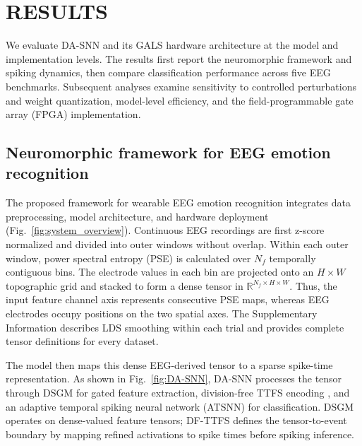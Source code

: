 ﻿\documentclass{nsr}
\begin{document}
\section{RESULTS}
We evaluate DA-SNN and its GALS hardware architecture at the model and implementation levels. The results first report the neuromorphic framework and spiking dynamics, then compare classification performance across five EEG benchmarks. Subsequent analyses examine sensitivity to controlled perturbations and weight quantization, model-level efficiency, and the field-programmable gate array (FPGA) implementation.


\subsection{Neuromorphic framework for EEG emotion recognition}

The proposed framework for wearable EEG emotion recognition integrates data preprocessing, model architecture, and hardware deployment (Fig.~\ref{fig:system_overview}). Continuous EEG recordings are first z-score normalized and divided into outer windows without overlap. Within each outer window, power spectral entropy (PSE) is calculated over $N_f$ temporally contiguous bins. The electrode values in each bin are projected onto an $H\times W$ topographic grid and stacked to form a dense tensor in $\mathbb{R}^{N_f\times H\times W}$. Thus, the input feature channel axis represents consecutive PSE maps, whereas EEG electrodes occupy positions on the two spatial axes. The Supplementary Information describes LDS smoothing within each trial and provides complete tensor definitions for every dataset.

The model then maps this dense EEG-derived tensor to a sparse spike-time representation. As shown in Fig.~\ref{fig:DA-SNN}, DA-SNN processes the tensor through DSGM for gated feature extraction, division-free TTFS encoding \cite{TTFS}, and an adaptive temporal spiking neural network (ATSNN) for classification. DSGM operates on dense-valued feature tensors; DF-TTFS defines the tensor-to-event boundary by mapping refined activations to spike times before spiking inference.
\end{document}
